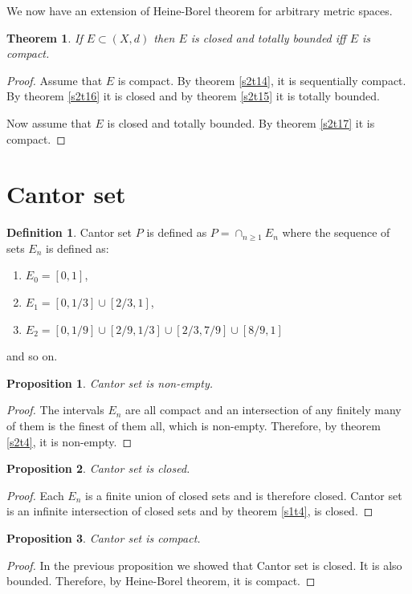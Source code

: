 \documentclass{article}
\theoremstyle{plain}
\newtheorem{thm}{Theorem}
\numberwithin{thm}{section}
\theoremstyle{plain}
\newtheorem{prop}{Proposition}
\numberwithin{prop}{section}
\theoremstyle{definition}
\newtheorem{defn}{Definition}
\numberwithin{defn}{section}
\theoremstyle{remark}
\numberwithin{equation}{section}
\begin{document}
We now have an extension of Heine-Borel theorem for arbitrary metric spaces.
\begin{thm}\label{s2t18}
If $E \subset (X, d)$ then $E$ is closed and totally bounded iff $E$ is compact.
\end{thm}
\begin{proof}
Assume that $E$ is compact. By theorem \ref{s2t14}, it is sequentially compact.
By theorem \ref{s2t16} it is closed and by theorem \ref{s2t15} it is totally 
bounded.

Now assume that $E$ is closed and totally bounded. By theorem \ref{s2t17} it is 
compact.
\end{proof}

\section{Cantor set}\label{s3}
\begin{defn}\label{s3d1}
Cantor set $P$ is defined as $P = \cap_{n \ge 1} E_n$ where the sequence of
sets $E_n$ is defined as:
\begin{enumerate}
\item $E_0 = [0, 1]$,
\item $E_1 = [0, 1/3] \cup [2/3, 1]$,
\item $E_2 = [0, 1/9] \cup [2/9, 1/3] \cup [2/3, 7/9] \cup [8/9, 1]$ 
\end{enumerate}
and so on.
\end{defn}

\begin{prop}\label{s3p1}
Cantor set is non-empty.
\end{prop}
\begin{proof}
The intervals $E_n$ are all compact and an intersection of any finitely many
of them is the finest of them all, which is non-empty. Therefore, by theorem
\ref{s2t4}, it is non-empty.
\end{proof}

\begin{prop}\label{s3t2}
Cantor set is closed.
\end{prop}
\begin{proof}
Each $E_n$ is a finite union of closed sets and is therefore closed. Cantor set
is an infinite intersection of closed sets and by theorem \ref{s1t4}, is closed.
\end{proof}

\begin{prop}\label{s3p3}
Cantor set is compact.
\end{prop}
\begin{proof}
In the previous proposition we showed that Cantor set is closed. It is also 
bounded. Therefore, by Heine-Borel theorem, it is compact.
\end{proof}
\end{document}
